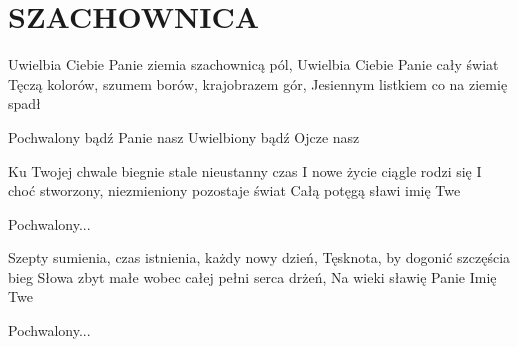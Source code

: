 \documentclass[../../../songbook.tex]{subfiles}
\begin{document}
\TabPositions{8cm} %
\section*{SZACHOWNICA}
{}
\vspace{0.5cm}
Uwielbia Ciebie Panie ziemia szachownicą pól,	 \newline
Uwielbia Ciebie Panie cały świat				 \newline
Tęczą kolorów, szumem borów, krajobrazem gór,	 \newline
Jesiennym listkiem co na ziemię spadł			 \newline
 
\-\hspace{1cm} Pochwalony bądź Panie nasz		    \newline   
\-\hspace{1cm} Uwielbiony bądź Ojcze nasz			 \newline  
 
Ku Twojej chwale biegnie stale nieustanny czas		 \newline
I nowe życie ciągle rodzi się		 \newline
I choć stworzony, niezmieniony pozostaje świat		 \newline
Całą potęgą sławi imię Twe		 \newline

\-\hspace{1cm} Pochwalony...		 \newline

Szepty sumienia, czas istnienia, każdy nowy dzień,		 \newline
Tęsknota, by dogonić szczęścia bieg		 \newline
Słowa zbyt małe wobec całej pełni serca drżeń,		 \newline
Na wieki sławię Panie Imię Twe		 \newline

\-\hspace{1cm} Pochwalony...		 \newline
\end{document}
